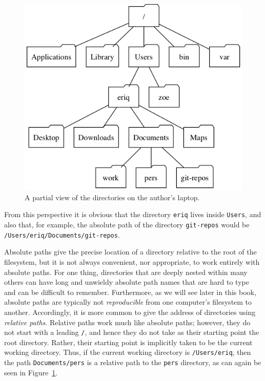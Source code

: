 \documentclass[]{krantz}
\begin{document}
\begin{figure}

{\centering \includegraphics{figs/file-hierarchy} 

}

\caption{A partial view of the directories on the author's laptop.}\label{fig:file-hierarchy}
\end{figure}

From this perspective it is obvious that the directory \texttt{eriq} lives inside \texttt{Users}, and also that, for example,
the absolute path of the directory \texttt{git-repos} would be \texttt{/Users/eriq/Documents/git-repos}.

Absolute paths give the precise location of a directory relative to the root of the filesystem,
but it is not always convenient, nor appropriate, to work entirely with absolute paths.
For one thing, directories that are deeply nested within many others can have long and unwieldy
absolute path names that are hard to type and can be difficult to remember. Furthermore, as we will
see later in this book, absolute paths are typically not \emph{reproducible} from one computer's
filesystem to another. Accordingly, it is more common to give the address of directories using
\emph{relative paths}. Relative paths work much like absolute paths; however, they do not start with
a leading \texttt{/}, and hence they do not take as their
starting point the root directory. Rather, their starting point is implicitly taken
to be the current working directory. Thus, if the current working directory is
\texttt{/Users/eriq}, then the path \texttt{Documents/pers} is a relative path to the
\texttt{pers} directory, as can again be seen in Figure~\ref{fig:file-hierarchy}.
\end{document}
